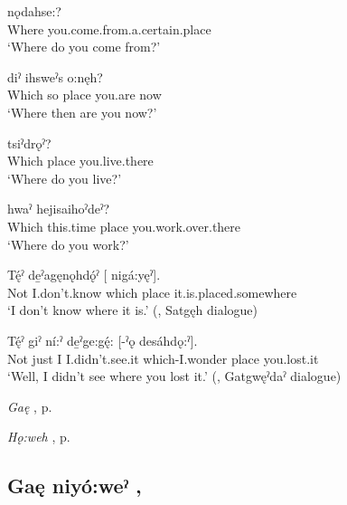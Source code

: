 \ea
\label{ex:gpart22}
\gll {} nǫdahse:? \\
Where you.come.from.a.certain.place\\
\glt ‘Where do you come from?’
\z

\ea
\label{ex:gpart23}
\gll {} diˀ  ihsweˀs o:nęh?\\
Which so place you.are now\\
\glt ‘Where then are you now?’
\z

\ea
\label{ex:gpart24}
\gll {}  tsiˀdrǫˀ?\\
Which place you.live.there\\
\glt ‘Where do you live?’
\z

\ea
\label{ex:gpart25}
\gll {} hwaˀ  hejisaihoˀdeˀ? \\
Which this.time place you.work.over.there\\
\glt ‘Where do you work?’
\z

\ea
\label{ex:gpart26}
\gll Tę́ˀ de̱ˀagęnǫhdǫ́ˀ [  nigá:yęˀ]. \\
Not I.don’t.know which place it.is.placed.somewhere\\
\glt ‘I don’t know where it is.’ (\cite[142]{mithun_watewayestanih_1984}, Satgęh dialogue)
\z

\ea
\label{ex:gpart27}
\gll Tę́ˀ giˀ ní:ˀ de̱ˀge:gę́: [-ˀǫ  desáhdǫ:ˀ].\\
Not just I I.didn’t.see.it which-I.wonder place you.lost.it\\
\glt ‘Well, I didn’t see where you lost it.’ (\cite[184]{mithun_watewayestanih_1984}, Gatgwęˀdaˀ dialogue)
\z

\begin{CayugaRelated}
\item \textit{Gaę} , p. \pageref{p:[gaę-]}\\
\item \textit{Hǫ:weh} , p. \pageref{p:[hǫ:weh]}
\end{CayugaRelated}

\subsection*{\textbf{Gaę niyó:weˀ} , } \label{p:[gaę niyó:weˀ]}

